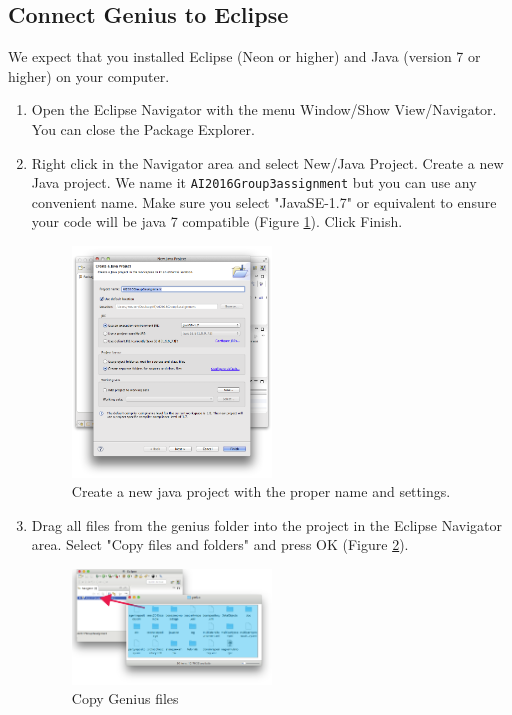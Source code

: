 \documentclass[]{article}
\begin{document}
\subsection{Connect Genius to Eclipse}
\label{sec:appendix-run-genius}
We expect that you installed Eclipse (Neon or higher) and Java (version 7 or higher) on your computer.
\begin{enumerate}

\item Open the Eclipse Navigator with the menu Window/Show View/Navigator. You can close the Package Explorer.

\item Right click in the Navigator area and select New/Java Project. Create a new Java project. We name it \texttt{AI2016Group3assignment} but you can use any convenient name. Make sure you select "JavaSE-1.7" or equivalent to ensure your code will be java 7 compatible (Figure \ref{fig:run-genius-1}). Click Finish.

\begin{figure}[h!]
	\centering
		\includegraphics[width=0.5\textwidth]{media/dialogNewJavaProject.png}
		\caption{Create a new java project with the proper name and settings.}
	\label{fig:run-genius-1}
\end{figure}

\item Drag all files from the genius folder into the project in the Eclipse Navigator area. Select "Copy files and folders" and press OK (Figure \ref{fig:run-genius-2}).

\begin{figure}[h!]
	\centering
		\includegraphics[width=0.5\textwidth]{media/dragdrop_generated.pdf}
		\caption{Copy Genius files}
	\label{fig:run-genius-2}
\end{figure}


\end{enumerate}
\end{document}
